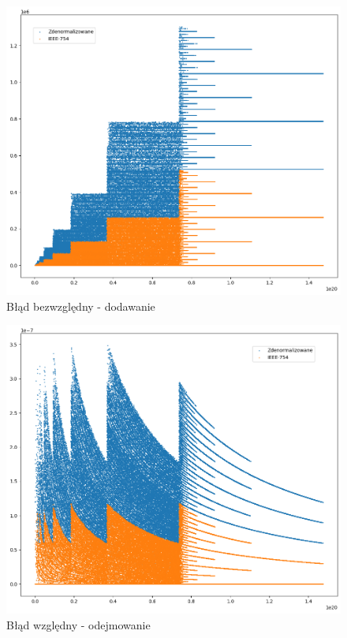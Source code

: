 \documentclass{article}
\begin{document}
\begin{figure}[H]
	\centering
	\includegraphics[height=0.4\textheight]{figures/add_ulp.png}
	\caption{Błąd bezwzględny - dodawanie}
	\label{fig:add_ulp}
\end{figure}


\begin{figure}[H]
	\centering
	\includegraphics[height=0.4\textheight]{figures/sub_relative.png}
	\caption{Błąd względny - odejmowanie}
	\label{fig:sub_relative}
\end{figure}
\end{document}
